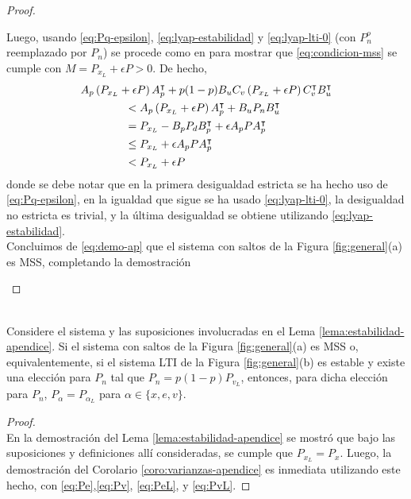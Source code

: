 \begin{proof}{\ \\}
\begin{enumerate}
Luego, usando \eqref{eq:Pq-epsilon}, \eqref{eq:lyap-estabilidad} y \eqref{eq:lyap-lti-0} (con $P_n^o$ reemplazado por $P_n$) se procede como en \cite{linlem04} para mostrar que \eqref{eq:condicion-mss} se cumple con $M = P_{x_L} + \epsilon P > 0$. De hecho,
\begin{align}
& A_p \left( P_{x_L} + \epsilon P \right)A_p^{\intercal} + p(1-p) B_u C_v \left( P_{x_L} + \epsilon
P \right) C_v^{\intercal} B_u^{\intercal} \nonumber \\
 & \qquad \qquad < A_p \left( P_{x_L} + \epsilon P \right) A_p^{\intercal} + B_uP_n B_u^{\intercal} \nonumber \\
 & \qquad \qquad = P_{x_L} - B_pP_dB_p^{\intercal} + \epsilon A_pP A_p^{\intercal} \nonumber \\
 & \qquad \qquad \leq P_{x_L} + \epsilon A_pPA_p^{\intercal} \nonumber \\ \label{eq:demo-ap}
 & \qquad \qquad < P_{x_L} + \epsilon P
\end{align}
donde se debe notar que en la primera desigualdad estricta se ha hecho uso de \eqref{eq:Pq-epsilon}, en la igualdad que sigue se ha usado \eqref{eq:lyap-lti-0}, la desigualdad no estricta es trivial, y la \'ultima desigualdad se obtiene utilizando \eqref{eq:lyap-estabilidad}.
\\ \noindent
Concluimos de \eqref{eq:demo-ap} que el sistema con saltos de la Figura \ref{fig:general}(a) es MSS, completando la demostraci\'on\QED
\end{enumerate}

\end{proof}

\begin{coro}\label{coro:varianzas-apendice}{\ \\}
Considere el sistema y las suposiciones involucradas en el Lema \ref{lema:estabilidad-apendice}.  Si el sistema con saltos de la Figura \ref{fig:general}(a) es MSS o, equivalentemente, si el sistema LTI de la Figura \ref{fig:general}(b) es estable y existe una elecci\'on para $P_n$ tal que $P_n=p(1-p)P_{v_L}$, entonces, para dicha elecci\'on para $P_n$, $P_{\alpha} = P_{\alpha_L}$ para $\alpha\in\{x,e,v\}$.
\end{coro}

\begin{proof}{\ \\}
En la demostraci\'on del Lema \ref{lema:estabilidad-apendice} se mostr\'o que bajo las suposiciones y definiciones all\'i consideradas, se cumple que $P_{x_L}=P_x$.  Luego, la demostraci\'on del Corolario \ref{coro:varianzas-apendice} es inmediata utilizando este hecho, con \eqref{eq:Pe},\eqref{eq:Pv}, \eqref{eq:PeL}, y \eqref{eq:PvL}.
\QED
\end{proof}

